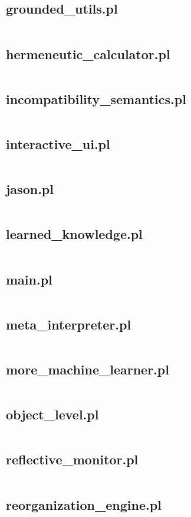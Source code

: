 \documentclass{article}
\begin{document}
\subsection{grounded\_utils.pl}
\inputminted{prolog}{grounded_utils.pl}
\subsection{hermeneutic\_calculator.pl}
\inputminted{prolog}{hermeneutic_calculator.pl}
\subsection{incompatibility\_semantics.pl}
\inputminted{prolog}{incompatibility_semantics.pl}
\subsection{interactive\_ui.pl}
\inputminted{prolog}{interactive_ui.pl}
\subsection{jason.pl}
\inputminted{prolog}{jason.pl}
\subsection{learned\_knowledge.pl}
\inputminted{prolog}{learned_knowledge.pl}
\subsection{main.pl}
\inputminted{prolog}{main.pl}
\subsection{meta\_interpreter.pl}
\inputminted{prolog}{meta_interpreter.pl}
\subsection{more\_machine\_learner.pl}
\inputminted{prolog}{more_machine_learner.pl}
\subsection{object\_level.pl}
\inputminted{prolog}{object_level.pl}
\subsection{reflective\_monitor.pl}
\inputminted{prolog}{reflective_monitor.pl}
\subsection{reorganization\_engine.pl}
\inputminted{prolog}{reorganization_engine.pl}
\end{document}
